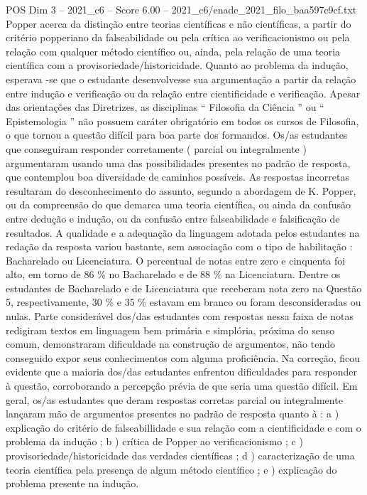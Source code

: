 \begin{textsample}{POS Dim 3 – 2021\_c6 – Score 6.00 – 2021\_c6/enade\_2021\_filo\_baa597e9cf.txt}
Popper acerca da distinção entre teorias científicas e não científicas, a partir do critério popperiano da falseabilidade ou pela crítica ao verificacionismo ou pela relação com qualquer método científico ou, ainda, pela relação de uma teoria científica com a provisoriedade/historicidade.
Quanto ao problema da indução, esperava -se que o estudante desenvolvesse sua argumentação a partir da relação entre indução e verificação ou da relação entre cientificidade e verificação.
Apesar das orientações das Diretrizes, as disciplinas “ Filosofia da Ciência ” ou “ Epistemologia ” não possuem caráter obrigatório em todos os cursos de Filosofia, o que tornou a questão difícil para boa parte dos formandos.
Os/as estudantes que conseguiram responder corretamente ( parcial ou integralmente ) argumentaram usando uma das possibilidades presentes no padrão de resposta, que contemplou boa diversidade de caminhos possíveis.
As respostas incorretas resultaram do desconhecimento do assunto, segundo a abordagem de K.
Popper, ou da compreensão do que demarca uma teoria científica, ou ainda da confusão entre dedução e indução, ou da confusão entre falseabilidade e falsificação de resultados.
A qualidade e a adequação da linguagem adotada pelos estudantes na redação da resposta variou bastante, sem associação com o tipo de habilitação : Bacharelado ou Licenciatura.
O percentual de notas entre zero e cinquenta foi alto, em torno de 86 \% no Bacharelado e de 88 \% na Licenciatura.
Dentre os estudantes de Bacharelado e de Licenciatura que receberam nota zero na Questão 5, respectivamente, 30 \% e 35 \% estavam em branco ou foram desconsideradas ou nulas.
Parte considerável dos/das estudantes com respostas nessa faixa de notas redigiram textos em linguagem bem primária e simplória, próxima do senso comum, demonstraram dificuldade na construção de argumentos, não tendo conseguido expor seus conhecimentos com alguma proficiência.
Na correção, ficou evidente que a maioria dos/das estudantes enfrentou dificuldades para responder à questão, corroborando a percepção prévia de que seria uma questão difícil.
Em geral, os/as estudantes que deram respostas corretas parcial ou integralmente lançaram mão de argumentos presentes no padrão de resposta quanto à : a ) explicação do critério de falseabillidade e sua relação com a cientificidade e com o problema da indução ; b ) crítica de Popper ao verificacionismo ; c ) provisoriedade/historicidade das verdades científicas ; d ) caracterização de uma teoria científica pela presença de algum método científico ; e ) explicação do problema presente na indução.

\end{textsample}
